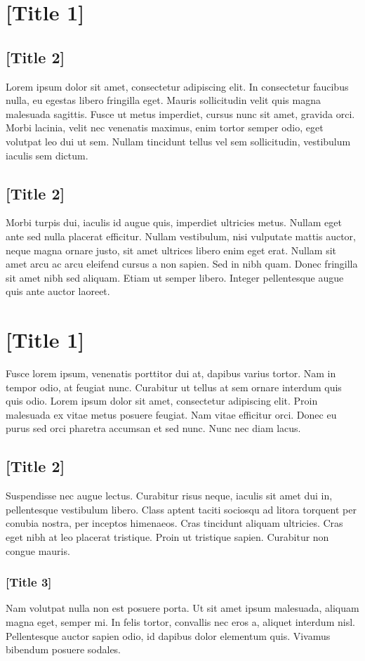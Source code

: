 \documentclass[12pt]{article}
\begin{document}
{\selectfont

\section{[Title 1]}

\subsection{[Title 2]}

Lorem ipsum dolor sit amet, consectetur adipiscing elit. In consectetur faucibus nulla, eu egestas libero fringilla eget. Mauris sollicitudin velit quis magna malesuada sagittis. Fusce ut metus imperdiet, cursus nunc sit amet, gravida orci. Morbi lacinia, velit nec venenatis maximus, enim tortor semper odio, eget volutpat leo dui ut sem. Nullam tincidunt tellus vel sem sollicitudin, vestibulum iaculis sem dictum. 

\subsection{[Title 2]}

Morbi turpis dui, iaculis id augue quis, imperdiet ultricies metus. Nullam eget ante sed nulla placerat efficitur. Nullam vestibulum, nisi vulputate mattis auctor, neque magna ornare justo, sit amet ultrices libero enim eget erat. Nullam sit amet arcu ac arcu eleifend cursus a non sapien. Sed in nibh quam. Donec fringilla sit amet nibh sed aliquam. Etiam ut semper libero. Integer pellentesque augue quis ante auctor laoreet.

\section{[Title 1]}

Fusce lorem ipsum, venenatis porttitor dui at, dapibus varius tortor. Nam in tempor odio, at feugiat nunc. Curabitur ut tellus at sem ornare interdum quis quis odio. Lorem ipsum dolor sit amet, consectetur adipiscing elit. Proin malesuada ex vitae metus posuere feugiat. Nam vitae efficitur orci. Donec eu purus sed orci pharetra accumsan et sed nunc. Nunc nec diam lacus.

\subsection{[Title 2]}

Suspendisse nec augue lectus. Curabitur risus neque, iaculis sit amet dui in, pellentesque vestibulum libero. Class aptent taciti sociosqu ad litora torquent per conubia nostra, per inceptos himenaeos. Cras tincidunt aliquam ultricies. Cras eget nibh at leo placerat tristique. Proin ut tristique sapien. Curabitur non congue mauris.

\subsubsection{[Title 3]}

Nam volutpat nulla non est posuere porta. Ut sit amet ipsum malesuada, aliquam magna eget, semper mi. In felis tortor, convallis nec eros a, aliquet interdum nisl. Pellentesque auctor sapien odio, id dapibus dolor elementum quis. Vivamus bibendum posuere sodales.

}
\end{document}
